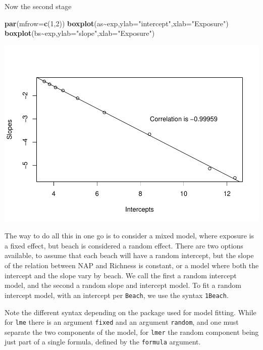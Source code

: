 \documentclass[
]{book}
\newenvironment{Shaded}{\begin{snugshade}}{\end{snugshade}}
\newcommand{\AttributeTok}[1]{\textcolor[rgb]{0.13,0.29,0.53}{#1}}
\newcommand{\DecValTok}[1]{\textcolor[rgb]{0.00,0.00,0.81}{#1}}
\newcommand{\FunctionTok}[1]{\textcolor[rgb]{0.13,0.29,0.53}{\textbf{#1}}}
\newcommand{\NormalTok}[1]{#1}
\newcommand{\SpecialCharTok}[1]{\textcolor[rgb]{0.81,0.36,0.00}{\textbf{#1}}}
\newcommand{\StringTok}[1]{\textcolor[rgb]{0.31,0.60,0.02}{#1}}
\begin{document}
Now the second stage

\begin{Shaded}
\begin{Highlighting}[]
\FunctionTok{par}\NormalTok{(}\AttributeTok{mfrow=}\FunctionTok{c}\NormalTok{(}\DecValTok{1}\NormalTok{,}\DecValTok{2}\NormalTok{))}
\FunctionTok{boxplot}\NormalTok{(as}\SpecialCharTok{\textasciitilde{}}\NormalTok{exp,}\AttributeTok{ylab=}\StringTok{"intercept"}\NormalTok{,}\AttributeTok{xlab=}\StringTok{"Exposure"}\NormalTok{)}
\FunctionTok{boxplot}\NormalTok{(bs}\SpecialCharTok{\textasciitilde{}}\NormalTok{exp,}\AttributeTok{ylab=}\StringTok{"slope"}\NormalTok{,}\AttributeTok{xlab=}\StringTok{"Exposure"}\NormalTok{)}
\end{Highlighting}
\end{Shaded}

\includegraphics{ECOMODbook_files/figure-latex/unnamed-chunk-66-1.pdf}

The way to do all this in one go is to consider a mixed model, where exposure is a fixed effect, but beach is considered a random effect. There are two options available, to assume that each beach will have a random intercept, but the slope of the relation between NAP and Richness is constant, or a model where both the intercept and the slope vary by beach. We call the first a random intercept model, and the second a random slope and intercept model. To fit a random intercept model, with an intercept per \texttt{Beach}, we use the syntax \texttt{1\textbar{}Beach}.

Note the different syntax depending on the package used for model fitting. While for \texttt{lme} there is an argument \texttt{fixed} and an argument \texttt{random}, and one must separate the two components of the model, for \texttt{lmer} the random component being just part of a single formula, defined by the \texttt{formula} argument.
\end{document}
